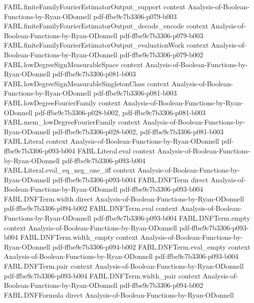 \begin{theorem}
\proofstep
  {FABL.finiteFamilyFourierEstimatorOutput_support}
  {context}
  {Analysis-of-Boolean-Functions-by-Ryan-ODonnell}
  {pdf-ffbe9c7b3306-p079-b003}
\proofstep
  {FABL.finiteFamilyFourierEstimatorOutput_decode_encode}
  {context}
  {Analysis-of-Boolean-Functions-by-Ryan-ODonnell}
  {pdf-ffbe9c7b3306-p079-b003}
\proofstep
  {FABL.finiteFamilyFourierEstimatorOutput_evaluationWork}
  {context}
  {Analysis-of-Boolean-Functions-by-Ryan-ODonnell}
  {pdf-ffbe9c7b3306-p079-b002}
\proofstep
  {FABL.lowDegreeSignMeasurableSpace}
  {context}
  {Analysis-of-Boolean-Functions-by-Ryan-ODonnell}
  {pdf-ffbe9c7b3306-p081-b003}
\proofstep
  {FABL.lowDegreeSignMeasurableSingletonClass}
  {context}
  {Analysis-of-Boolean-Functions-by-Ryan-ODonnell}
  {pdf-ffbe9c7b3306-p081-b003}
\proofstep
  {FABL.lowDegreeFourierFamily}
  {context}
  {Analysis-of-Boolean-Functions-by-Ryan-ODonnell}
  {pdf-ffbe9c7b3306-p028-b002,
    pdf-ffbe9c7b3306-p081-b003}
\proofstep
  {FABL.mem_lowDegreeFourierFamily}
  {context}
  {Analysis-of-Boolean-Functions-by-Ryan-ODonnell}
  {pdf-ffbe9c7b3306-p028-b002,
    pdf-ffbe9c7b3306-p081-b003}
\proofstep
  {FABL.Literal}
  {context}
  {Analysis-of-Boolean-Functions-by-Ryan-ODonnell}
  {pdf-ffbe9c7b3306-p093-b004}
\proofstep
  {FABL.Literal.eval}
  {context}
  {Analysis-of-Boolean-Functions-by-Ryan-ODonnell}
  {pdf-ffbe9c7b3306-p093-b004}
\proofstep
  {FABL.Literal.eval_eq_neg_one_iff}
  {context}
  {Analysis-of-Boolean-Functions-by-Ryan-ODonnell}
  {pdf-ffbe9c7b3306-p093-b004}
\proofstep
  {FABL.DNFTerm}
  {direct}
  {Analysis-of-Boolean-Functions-by-Ryan-ODonnell}
  {pdf-ffbe9c7b3306-p093-b004}
\proofstep
  {FABL.DNFTerm.width}
  {direct}
  {Analysis-of-Boolean-Functions-by-Ryan-ODonnell}
  {pdf-ffbe9c7b3306-p094-b002}
\proofstep
  {FABL.DNFTerm.eval}
  {context}
  {Analysis-of-Boolean-Functions-by-Ryan-ODonnell}
  {pdf-ffbe9c7b3306-p093-b004}
\proofstep
  {FABL.DNFTerm.empty}
  {context}
  {Analysis-of-Boolean-Functions-by-Ryan-ODonnell}
  {pdf-ffbe9c7b3306-p093-b004}
\proofstep
  {FABL.DNFTerm.width_empty}
  {context}
  {Analysis-of-Boolean-Functions-by-Ryan-ODonnell}
  {pdf-ffbe9c7b3306-p094-b002}
\proofstep
  {FABL.DNFTerm.eval_empty}
  {context}
  {Analysis-of-Boolean-Functions-by-Ryan-ODonnell}
  {pdf-ffbe9c7b3306-p093-b004}
\proofstep
  {FABL.DNFTerm.pair}
  {context}
  {Analysis-of-Boolean-Functions-by-Ryan-ODonnell}
  {pdf-ffbe9c7b3306-p093-b004}
\proofstep
  {FABL.DNFTerm.width_pair}
  {context}
  {Analysis-of-Boolean-Functions-by-Ryan-ODonnell}
  {pdf-ffbe9c7b3306-p094-b002}
\proofstep
  {FABL.DNFFormula}
  {direct}
  {Analysis-of-Boolean-Functions-by-Ryan-ODonnell}

\end{theorem}
